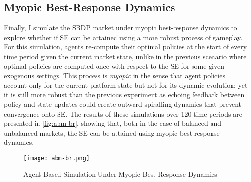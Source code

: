 \subsection{Myopic Best-Response Dynamics}
Finally, I simulate the SBDP market under myopic best-response dynamics \citep{fudenberg1998theory} to explore whether if SE can be attained using a more robust process of gameplay. 
For this simulation, agents re-compute their optimal policies at the start of every time period given the current market state, unlike in the previous scenario where optimal policies are computed once with respect to the SE for some given exogenous settings. 
This process is \textit{myopic} in the sense that agent policies account only for the current platform state but not for its dynamic evolution; yet it is still more robust than the previous experiment as echoing feedback between policy and state updates could create outward-spiralling dynamics that prevent convergence onto SE. 
The results of these simulations over 120 time periods are presented in \autoref{fig:abm-br}, showing that, both in the case of balanced and unbalanced markets, the SE can be attained using myopic best response dynamics. 
\begin{figure}[ht] 
    \centering
    \caption{Agent-Based Simulation Under Myopic Best Response Dynamics}
    \texttt{[image: abm-br.png]}
    \label{fig:abm-br}
\end{figure}   